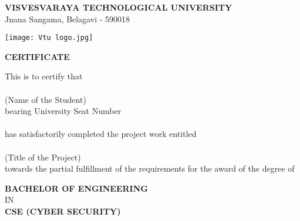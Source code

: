 \documentclass[12pt, a4paper]{report}
\begin{document}
\thispagestyle{empty}

\begin{titlepage}
\begin{center}

\textbf{{\large VISVESVARAYA TECHNOLOGICAL UNIVERSITY}}\\
{\normalsize Jnana Sangama, Belagavi - 590018}\\
\vspace{0.5in}

\texttt{[image: Vtu logo.jpg]}\\
\vspace{0.5in}

\textbf{\Large CERTIFICATE}\\
\vspace{0.3in}

This is to certify that\\
\vspace{0.2in}
\underline{\hspace{10cm}}\\
\vspace{0.2in}
(Name of the Student)\\
\vspace{0.2in}
bearing University Seat Number\\
\vspace{0.2in}
\underline{\hspace{10cm}}\\
\vspace{0.2in}
has satisfactorily completed the project work entitled\\
\vspace{0.2in}
\underline{\hspace{10cm}}\\
\vspace{0.2in}
(Title of the Project)\\
\vspace{0.2in}
towards the partial fulfillment of the requirements for the award of the degree of\\
\vspace{0.2in}

\textbf{BACHELOR OF ENGINEERING}\\
IN\\
\textbf{CSE (CYBER SECURITY)}\\
\vspace{0.5in}


\end{center}
\end{titlepage}
\end{document}
